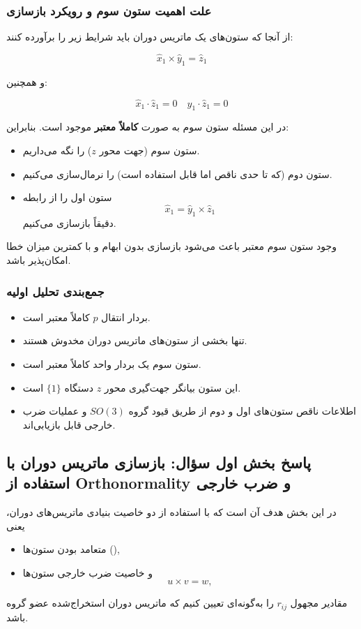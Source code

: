 \documentclass{article}
\begin{document}
\subsubsection{علت اهمیت ستون سوم و رویکرد بازسازی}
از آنجا که ستون‌های یک ماتریس دوران باید شرایط زیر را برآورده کنند:

\[
\hat{x}_1 \times \hat{y}_1 = \hat{z}_1
\]

و همچنین:

\[
\hat{x}_1 \cdot \hat{z}_1 = 0
\quad
\hat{y}_1 \cdot \hat{z}_1 = 0
\]

در این مسئله ستون سوم به صورت \textbf{کاملاً معتبر} موجود است. بنابراین:

\begin{itemize}
	\item ستون سوم (جهت محور $z$) را نگه می‌داریم.
	\item ستون دوم (که تا حدی ناقص اما قابل استفاده است) را نرمال‌سازی می‌کنیم.
	\item ستون اول را از رابطه
	\[
	\hat{x}_1 = \hat{y}_1 \times \hat{z}_1
	\]
	دقیقاً بازسازی می‌کنیم.
\end{itemize}

وجود ستون سوم معتبر باعث می‌شود بازسازی بدون ابهام و با کمترین میزان خطا امکان‌پذیر باشد.

\subsubsection{جمع‌بندی تحلیل اولیه}
\begin{itemize}
	\item بردار انتقال $p$ کاملاً معتبر است.
	\item تنها بخشی از ستون‌های ماتریس دوران مخدوش هستند.
	\item ستون سوم یک بردار واحد کاملاً معتبر است.
	\item این ستون بیانگر جهت‌گیری محور $z$ دستگاه $\{1\}$ است.
	\item اطلاعات ناقص ستون‌های اول و دوم از طریق قیود گروه $SO(3)$ و عملیات ضرب خارجی قابل بازیابی‌اند.
\end{itemize}


\subsection{پاسخ بخش اول سؤال: بازسازی ماتریس دوران با استفاده از Orthonormality و ضرب خارجی}

در این بخش هدف آن است که با استفاده از دو خاصیت بنیادی ماتریس‌های دوران، یعنی
\begin{itemize}
	\item متعامد بودن ستون‌ها (),
	\item و خاصیت ضرب خارجی ستون‌ها   
	\[
	u \times v = w,
	\]
\end{itemize}
مقادیر مجهول $r_{ij}$ را به‌گونه‌ای تعیین کنیم که ماتریس دوران استخراج‌شده عضو گروه  باشد.
\end{document}
